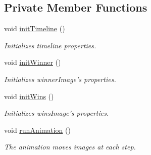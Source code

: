 \subsection*{Private Member Functions}
\begin{DoxyCompactItemize}
\item 
void \hyperlink{classbattleship2D_1_1ui_1_1EndGame_a3ce154a1f3cc9d83c1c678efcb36744e}{init\-Timeline} ()
\begin{DoxyCompactList}\small\item\em Initializes timeline properties. \end{DoxyCompactList}\item 
void \hyperlink{classbattleship2D_1_1ui_1_1EndGame_ae277746ac5dee64f49809a5174182453}{init\-Winner} ()
\begin{DoxyCompactList}\small\item\em Initializes winner\-Image's properties. \end{DoxyCompactList}\item 
void \hyperlink{classbattleship2D_1_1ui_1_1EndGame_a9128f76080cf1cbfe96730dc63226957}{init\-Wins} ()
\begin{DoxyCompactList}\small\item\em Initializes wins\-Image's properties. \end{DoxyCompactList}\item 
void \hyperlink{classbattleship2D_1_1ui_1_1EndGame_a1e19a1c4486117186a7ca32da05f880e}{run\-Animation} ()
\begin{DoxyCompactList}\small\item\em The animation moves images at each step. \end{DoxyCompactList}\end{DoxyCompactItemize}
